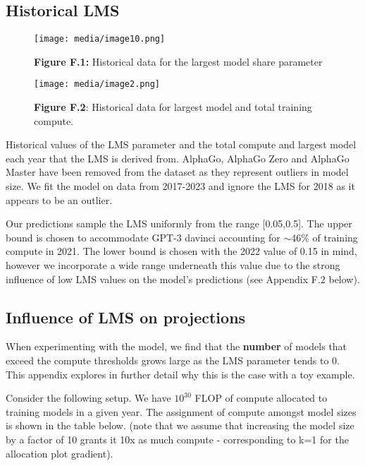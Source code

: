 \documentclass[11pt]{article}
\begin{document}
\subsection{Historical LMS}
\label{f.1-historical-lms}

\begin{figure}[h]
\centering
\texttt{[image: media/image10.png]}
\caption*{\textbf{Figure F.1:} Historical data for the largest model share parameter}
\end{figure}

\begin{figure}[h]
\centering
\texttt{[image: media/image2.png]}
\caption*{\textbf{Figure F.2}: Historical data for largest model and total training compute.}
\end{figure}

Historical values of the LMS parameter and the total compute and largest model each year that the LMS is derived from. AlphaGo, AlphaGo Zero and AlphaGo Master have been removed from the dataset as they represent outliers in model size. We fit the model on data from 2017-2023 and ignore the LMS for 2018 as it appears to be an outlier.

Our predictions sample the LMS uniformly from the range [0.05,0.5]. The upper bound is chosen to accommodate GPT-3 davinci accounting for $\sim$46\% of training compute in 2021. The lower bound is chosen with the 2022 value of 0.15 in mind, however we incorporate a wide range underneath this value due to the strong influence of low LMS values on the model's predictions (see Appendix F.2 below).

\subsection{Influence of LMS on projections}
\label{f.2-influence-of-lms-on-projections}

When experimenting with the model, we find that the \textbf{number} of models that exceed the compute thresholds grows large as the LMS parameter tends to 0. This appendix explores in further detail why this is the case with a toy example.

Consider the following setup. We have $10^{30}$ FLOP of compute allocated to training models in a given year. The assignment of compute amongst model sizes is shown in the table below. (note that we assume that increasing the model size by a factor of 10 grants it 10x as much compute - corresponding to k=1 for the allocation plot gradient).
\end{document}
